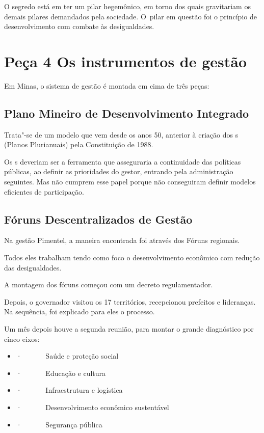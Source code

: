 O segredo está em ter um pilar hegemônico, em torno dos quais
gravitariam os demais pilares demandados pela sociedade. O~pilar em
questão foi o princípio de desenvolvimento com combate às desigualdades.

\section{Peça 4 Os instrumentos de gestão}

Em Minas, o sistema de gestão é montada em cima de três peças:

\subsection{Plano Mineiro de Desenvolvimento Integrado}

Trata"-se de um modelo que vem desde os anos 50, anterior à criação dos
s (Planos Plurianuais) pela Constituição de 1988.

Os s deveriam ser a ferramenta que asseguraria a continuidade das
políticas públicas, ao definir as prioridades do gestor, entrando pela
administração seguintes. Mas não cumprem esse papel porque não
conseguiram definir modelos eficientes de participação.

\subsection{\textbf{Fóruns Descentralizados de Gestão}}

Na gestão Pimentel, a maneira encontrada foi através dos Fóruns
regionais.

Todos eles trabalham tendo como foco o desenvolvimento econômico com
redução das desigualdades.

A montagem dos fóruns começou com um decreto regulamentador.

Depois, o governador visitou os 17 territórios, recepcionou prefeitos e
lideranças. Na sequência, foi explicado para eles o processo.

Um mês depois houve a segunda reunião, para montar o grande diagnóstico
por cinco eixos:

\begin{itemize}
\itemsep1pt\parskip0pt
\item
  ·~~~~~~ Saúde e proteção social
\item
  ·~~~~~~ Educação e cultura
\item
  ·~~~~~~ Infraestrutura e logística
\item
  ·~~~~~~ Desenvolvimento econômico sustentável
\item
  ·~~~~~~ Segurança pública
\end{itemize}

